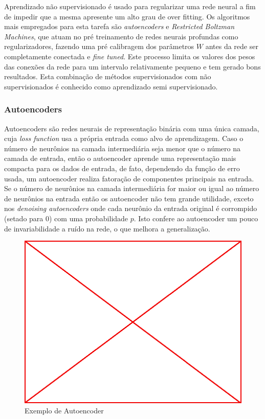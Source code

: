 Aprendizado não supervisionado é usado para regularizar uma rede neural a fim
de impedir que a mesma apresente um alto grau de over fitting. Os algoritmos
mais empregados para esta tarefa são \emph{autoencoders} e \emph{Restricted
  Boltzman Machines}, que atuam no pré treinamento de redes neurais profundas
como regularizadores, fazendo uma pré calibragem dos parâmetros $W$ antes da
rede ser completamente conectada e \emph{fine tuned}. Este processo limita os
valores dos pesos das conexões da rede para um intervalo relativamente pequeno
e tem gerado bons resultados. Esta combinação de métodos supervisionados com
não supervisionados é conhecido como aprendizado semi supervisionado.

\subsubsection{Autoencoders}

Autoencoders são redes neurais de representação binária com uma única camada,
cuja \emph{loss function} usa a própria entrada como alvo de aprendizagem. Caso
o número de neurônios na camada intermediária seja menor que o número na camada
de entrada, então o autoencoder aprende uma representação mais compacta para os
dados de entrada, de fato, dependendo da função de erro usada, um autoencoder
realiza fatoração de componentes principais na entrada. Se o número de
neurônios na camada intermediária for maior ou igual ao número de neurônios na
entrada então os autoencoder não tem grande utilidade, exceto nos
\emph{denoising autoencoders} onde cada neurônio da entrada original é
corrompido (setado para 0) com uma probabilidade $p$. Isto confere ao
autoencoder um pouco de invariabilidade a ruído na rede, o que melhora a
generalização.

\begin{figure}
  \caption{Exemplo de Autoencoder}
  \begin{center}
    \includegraphics[scale=0.5]{placeholder}
  \end{center}
\end{figure}

